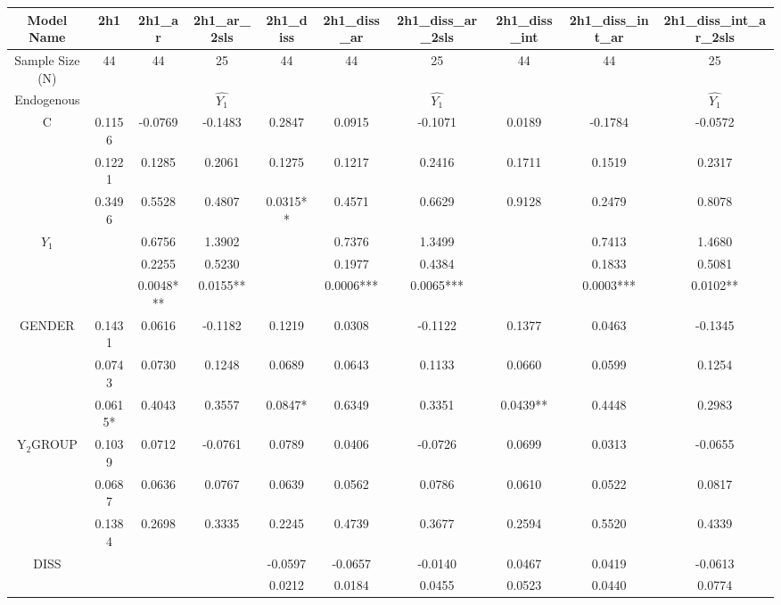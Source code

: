 \documentclass[]{article}
\begin{document}
	\begin{landscape}
		\begin{table}[htp] 
			\centering 
			\begin{adjustbox}{height=0.55\textheight,width=1.6\textwidth}
				\begin{tabular}{c|ccc|ccc|ccc}
					\hline
					Model Name & 2h1 & 2h1\_ar & 2h1\_ar\_2sls & 2h1\_diss & 2h1\_diss\_ar & 2h1\_diss\_ar\_2sls & 2h1\_diss\_int & 2h1\_diss\_int\_ar & 2h1\_diss\_int\_ar\_2sls \\
					\hline
					Sample Size (N) & 44 & 44 & 25 & 44 & 44 & 25 & 44 & 44 & 25 \\
					\hline
					Endogenous &  &  & $\hat{Y_1}$ &  &  & $\hat{Y_1}$ &  &  & $\hat{Y_1}$ \\
					\hline
					C & 0.1156 & -0.0769 & -0.1483 & 0.2847 & 0.0915 & -0.1071 & 0.0189 & -0.1784 & -0.0572 \\
					& 0.1221 & 0.1285 & 0.2061 & 0.1275 & 0.1217 & 0.2416 & 0.1711 & 0.1519 & 0.2317 \\
					& 0.3496 & 0.5528 & 0.4807 & 0.0315** & 0.4571 & 0.6629 & 0.9128 & 0.2479 & 0.8078 \\
					\hline
					$Y_1$ &  & 0.6756 & 1.3902 &  & 0.7376 & 1.3499 &  & 0.7413 & 1.4680 \\
					&  & 0.2255 & 0.5230 &  & 0.1977 & 0.4384 &  & 0.1833 & 0.5081 \\
					&  & 0.0048*** & 0.0155** &  & 0.0006*** & 0.0065*** &  & 0.0003*** & 0.0102** \\
					\hline
					GENDER & 0.1431 & 0.0616 & -0.1182 & 0.1219 & 0.0308 & -0.1122 & 0.1377 & 0.0463 & -0.1345 \\
					& 0.0743 & 0.0730 & 0.1248 & 0.0689 & 0.0643 & 0.1133 & 0.0660 & 0.0599 & 0.1254 \\
					& 0.0615* & 0.4043 & 0.3557 & 0.0847* & 0.6349 & 0.3351 & 0.0439** & 0.4448 & 0.2983 \\
					Y$_2$GROUP & 0.1039 & 0.0712 & -0.0761 & 0.0789 & 0.0406 & -0.0726 & 0.0699 & 0.0313 & -0.0655 \\
					& 0.0687 & 0.0636 & 0.0767 & 0.0639 & 0.0562 & 0.0786 & 0.0610 & 0.0522 & 0.0817 \\
					& 0.1384 & 0.2698 & 0.3335 & 0.2245 & 0.4739 & 0.3677 & 0.2594 & 0.5520 & 0.4339 \\
					\hline
					DISS &  &  &  & -0.0597 & -0.0657 & -0.0140 & 0.0467 & 0.0419 & -0.0613 \\
					&  &  &  & 0.0212 & 0.0184 & 0.0455 & 0.0523 & 0.0440 & 0.0774 \\

\end{tabular}
\end{adjustbox}
\end{table}
\end{landscape}
\end{document}

